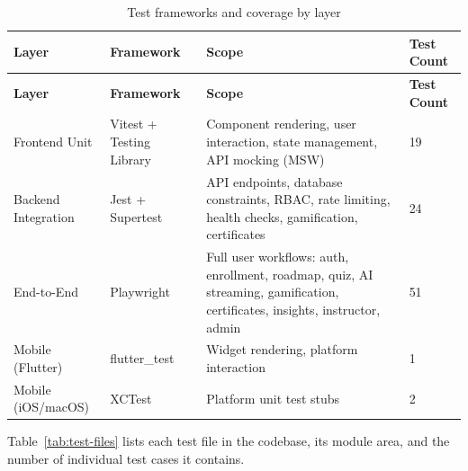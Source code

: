 \begin{longtable}{p{2.5cm}p{2.5cm}p{4cm}p{4cm}}
\caption{Test frameworks and coverage by layer}
\label{tab:test-frameworks}\\
\toprule
\textbf{Layer} & \textbf{Framework} & \textbf{Scope} & \textbf{Test Count} \\
\midrule
\endfirsthead
\toprule
\textbf{Layer} & \textbf{Framework} & \textbf{Scope} & \textbf{Test Count} \\
\midrule
\endhead
Frontend Unit & Vitest + Testing Library & Component rendering, user interaction, state management, API mocking (MSW) & 19 \\
Backend Integration & Jest + Supertest & API endpoints, database constraints, RBAC, rate limiting, health checks, gamification, certificates & 24 \\
End-to-End & Playwright & Full user workflows: auth, enrollment, roadmap, quiz, AI streaming, gamification, certificates, insights, instructor, admin & 51 \\
Mobile (Flutter) & flutter\_test & Widget rendering, platform interaction & 1 \\
Mobile (iOS/macOS) & XCTest & Platform unit test stubs & 2 \\
\bottomrule
\end{longtable}

Table~\ref{tab:test-files} lists each test file in the codebase, its module area, and the number of individual test cases it contains.

